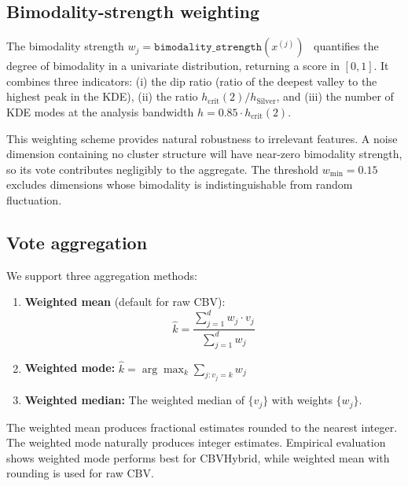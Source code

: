 \documentclass[journal]{IEEEtran}
\begin{document}
\subsection{Bimodality-strength weighting}
\label{sec:bimodality-weighting}

The bimodality strength $w_j = \texttt{bimodality\_strength}(x^{(j)})$~\cite{zhang2026critband, critband2025} quantifies the degree of bimodality in a univariate distribution, returning a score in $[0, 1]$. It combines three indicators: (i) the dip ratio (ratio of the deepest valley to the highest peak in the KDE), (ii) the ratio $h_{\mathrm{crit}}(2) / h_{\mathrm{Silver}}$, and (iii) the number of KDE modes at the analysis bandwidth $h = 0.85 \cdot h_{\mathrm{crit}}(2)$.

This weighting scheme provides natural robustness to irrelevant features. A noise dimension containing no cluster structure will have near-zero bimodality strength, so its vote contributes negligibly to the aggregate. The threshold $w_{\min} = 0.15$ excludes dimensions whose bimodality is indistinguishable from random fluctuation.

\subsection{Vote aggregation}
\label{sec:aggregation}

We support three aggregation methods:

\begin{enumerate}
    \item \textbf{Weighted mean} (default for raw CBV):
    \begin{equation}
    \hat{k} = \frac{\sum_{j=1}^{d} w_j \cdot v_j}{\sum_{j=1}^{d} w_j}
    \label{eq:weighted-mean}
    \end{equation}

    \item \textbf{Weighted mode:} $\hat{k} = \arg\max_k \sum_{j: v_j = k} w_j$

    \item \textbf{Weighted median:} The weighted median of $\{v_j\}$ with weights $\{w_j\}$.
\end{enumerate}

The weighted mean produces fractional estimates rounded to the nearest integer. The weighted mode naturally produces integer estimates. Empirical evaluation shows weighted mode performs best for CBVHybrid, while weighted mean with rounding is used for raw CBV.
\end{document}
